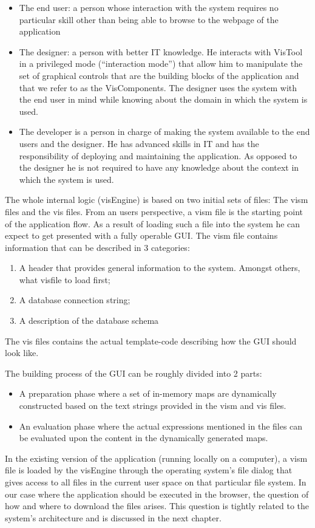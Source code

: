\begin{itemize}
    \item The end user: a person whose interaction with the system requires no particular skill other than being able to browse to the webpage of the application
    
    \item The designer: a person with better IT knowledge. He interacts with VisTool in a privileged mode (``interaction mode'') that allow him to manipulate the set of graphical controls that are the building blocks of the application and that we refer to as the VisComponents. The designer uses the system with the end user in mind while knowing about the domain in which the system is used. 

    \item The developer is a person in charge of making the system available to the end users and the designer. He has advanced skills in IT and has the responsibility of deploying and maintaining the application. As opposed to the designer he is not required to have any knowledge about the context in which the system is used.

\end{itemize}

The whole internal logic (visEngine) is based on two initial sets of files: The vism files and the vis files.
From an users perspective, a vism file is the starting point of the application flow. As a result of loading such a file into the system he can expect to get presented with a fully operable GUI. The vism file contains information that can be described in 3 categories:

\begin{enumerate}
    \item A header that provides general information to the system. Amongst others, what visfile to load first;
    \item A database connection string;
    \item A description of the database schema
\end{enumerate}

The vis files contains the actual template-code describing how the GUI should look like.

The building process of the GUI can be roughly divided into 2 parts:
\begin{itemize}
    \item A preparation phase where a set of in-memory maps are dynamically constructed based on the text strings provided in the vism and vis files.
    \item An evaluation phase where the actual expressions mentioned in the files can be evaluated upon the content in the dynamically generated maps.
\end{itemize}

In the existing version of the application (running locally on a computer), a vism file is loaded by the visEngine through the operating system's file dialog that gives access to all files in the current user space on that particular file system. In our case where the application should be executed in the browser, the question of how and where to download the files arises. This question is tightly related to the system's architecture and is discussed in the next chapter.